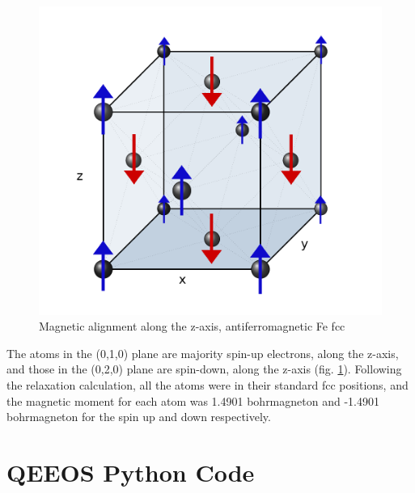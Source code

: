 \begin{figure}[ht] 
  \begin{minipage}[b]{0.8\linewidth}
    \centering
    \includegraphics[width=.9\linewidth]{chapters/potentials_fe_pd_ru/images/fe-austenitic-mag.png} 
    \caption{Magnetic alignment along the z-axis, antiferromagnetic Fe fcc}  
  \end{minipage}
  \label{fig:ironfccantiferromagnetic}
\end{figure}

The atoms in the (0,1,0) plane are majority spin-up electrons, along the z-axis, and those in the (0,2,0) plane are spin-down, along the z-axis (fig. \ref{fig:ironfccantiferromagnetic}).  Following the relaxation calculation, all the atoms were in their standard \acrshort{fcc} positions, and the magnetic moment for each atom was 1.4901 \gls{bohrmagneton} and -1.4901 \gls{bohrmagneton} for the spin up and down respectively.  








\FloatBarrier
\section{QEEOS Python Code}
\label{code:qeeos}

